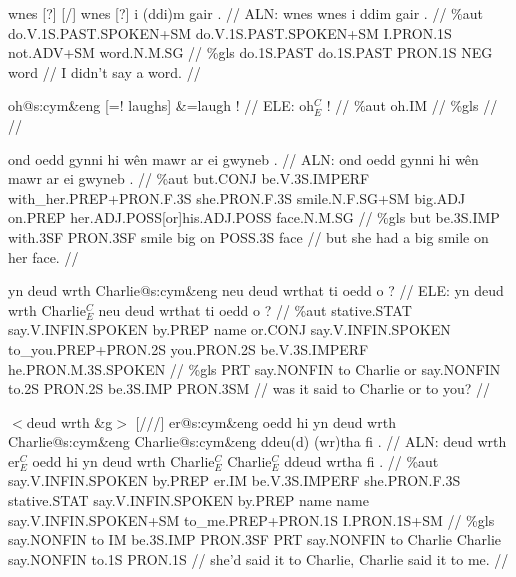 \documentclass[a4paper,10pt]{article}
\begin{document}
\ex
\begingl[lingstyle=gergl]
\glchat wnes [?] [/] wnes [?] i (ddi)m gair . //
\glsurface ALN:  wnes wnes i ddim gair .  //
\glauto \%aut  do{\scriptsize .V.1S.PAST.SPOKEN+SM} do{\scriptsize .V.1S.PAST.SPOKEN+SM} I{\scriptsize .PRON.1S} not{\scriptsize .ADV+SM} word{\scriptsize .N.M.SG}   //
\glmanual \%gls  do{\scriptsize .1S.PAST} do{\scriptsize .1S.PAST} PRON{\scriptsize .1S} NEG word   //
\gleng I didn't say a word. //
\endgl
\xe

\ex
\begingl[lingstyle=gergl]
\glchat oh@s:cym\&eng [=! laughs] \&=laugh ! //
\glsurface ELE:  oh$^{C}_{E}$ !  //
\glauto \%aut  oh{\scriptsize .IM}   //
\glmanual \%gls     //
\gleng  //
\endgl
\xe

\ex
\begingl[lingstyle=gergl]
\glchat ond oedd gynni hi wên mawr ar ei gwyneb . //
\glsurface ALN:  ond oedd gynni hi wên mawr ar ei gwyneb .  //
\glauto \%aut  but{\scriptsize .CONJ} be{\scriptsize .V.3S.IMPERF} with\_her{\scriptsize .PREP+PRON.F.3S} she{\scriptsize .PRON.F.3S} smile{\scriptsize .N.F.SG+SM} big{\scriptsize .ADJ} on{\scriptsize .PREP} her{\scriptsize .ADJ.POSS[or]his.ADJ.POSS} face{\scriptsize .N.M.SG}   //
\glmanual \%gls  but be{\scriptsize .3S.IMP} with{\scriptsize .3SF} PRON{\scriptsize .3SF} smile big on POSS{\scriptsize .3S} face   //
\gleng but she had a big smile on her face. //
\endgl
\xe

\ex
\begingl[lingstyle=gergl]
\glchat yn deud wrth Charlie@s:cym\&eng neu deud wrthat ti oedd o ? //
\glsurface ELE:  yn deud wrth Charlie$^{C}_{E}$ neu deud wrthat ti oedd o ?  //
\glauto \%aut  stative{\scriptsize .STAT} say{\scriptsize .V.INFIN.SPOKEN} by{\scriptsize .PREP} name or{\scriptsize .CONJ} say{\scriptsize .V.INFIN.SPOKEN} to\_you{\scriptsize .PREP+PRON.2S} you{\scriptsize .PRON.2S} be{\scriptsize .V.3S.IMPERF} he{\scriptsize .PRON.M.3S.SPOKEN}   //
\glmanual \%gls  PRT say{\scriptsize .NONFIN} to Charlie or say{\scriptsize .NONFIN} to{\scriptsize .2S} PRON{\scriptsize .2S} be{\scriptsize .3S.IMP} PRON{\scriptsize .3SM}   //
\gleng was it said to Charlie or to you? //
\endgl
\xe

\ex
\begingl[lingstyle=gergl]
\glchat $<$deud wrth \&g$>$ [///] er@s:cym\&eng oedd hi yn deud wrth Charlie@s:cym\&eng Charlie@s:cym\&eng ddeu(d) (wr)tha fi . //
\glsurface ALN:  deud wrth er$^{C}_{E}$ oedd hi yn deud wrth Charlie$^{C}_{E}$ Charlie$^{C}_{E}$ ddeud wrtha fi .  //
\glauto \%aut  say{\scriptsize .V.INFIN.SPOKEN} by{\scriptsize .PREP} er{\scriptsize .IM} be{\scriptsize .V.3S.IMPERF} she{\scriptsize .PRON.F.3S} stative{\scriptsize .STAT} say{\scriptsize .V.INFIN.SPOKEN} by{\scriptsize .PREP} name name say{\scriptsize .V.INFIN.SPOKEN+SM} to\_me{\scriptsize .PREP+PRON.1S} I{\scriptsize .PRON.1S+SM}   //
\glmanual \%gls  say{\scriptsize .NONFIN} to IM be{\scriptsize .3S.IMP} PRON{\scriptsize .3SF} PRT say{\scriptsize .NONFIN} to Charlie Charlie say{\scriptsize .NONFIN} to{\scriptsize .1S} PRON{\scriptsize .1S}   //
\gleng she'd said it to Charlie, Charlie said it to me. //
\endgl
\xe
\end{document}

